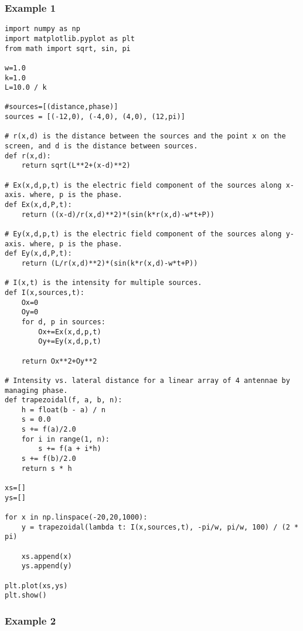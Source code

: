 \subsubsection{Example 1}\label{code:phase_right}

\begin{Verbatim}[fontsize=\small,baselinestretch=0.9]
import numpy as np
import matplotlib.pyplot as plt
from math import sqrt, sin, pi

w=1.0
k=1.0
L=10.0 / k

#sources=[(distance,phase)]
sources = [(-12,0), (-4,0), (4,0), (12,pi)]

# r(x,d) is the distance between the sources and the point x on the screen, and d is the distance between sources.
def r(x,d):
    return sqrt(L**2+(x-d)**2)
    
# Ex(x,d,p,t) is the electric field component of the sources along x-axis. where, p is the phase.
def Ex(x,d,P,t):
    return ((x-d)/r(x,d)**2)*(sin(k*r(x,d)-w*t+P))

# Ey(x,d,p,t) is the electric field component of the sources along y-axis. where, p is the phase.
def Ey(x,d,P,t):
    return (L/r(x,d)**2)*(sin(k*r(x,d)-w*t+P))
       
# I(x,t) is the intensity for multiple sources.
def I(x,sources,t):
    Ox=0
    Oy=0
    for d, p in sources:
        Ox+=Ex(x,d,p,t)
        Oy+=Ey(x,d,p,t)
    
    return Ox**2+Oy**2
        
# Intensity vs. lateral distance for a linear array of 4 antennae by managing phase.
def trapezoidal(f, a, b, n):
    h = float(b - a) / n
    s = 0.0
    s += f(a)/2.0
    for i in range(1, n):
        s += f(a + i*h)
    s += f(b)/2.0
    return s * h

xs=[]
ys=[]

for x in np.linspace(-20,20,1000):
    y = trapezoidal(lambda t: I(x,sources,t), -pi/w, pi/w, 100) / (2 * pi)
   
    xs.append(x)
    ys.append(y)

plt.plot(xs,ys)
plt.show()   
\end{Verbatim}


\subsubsection{Example 2}\label{code:phase_left}

